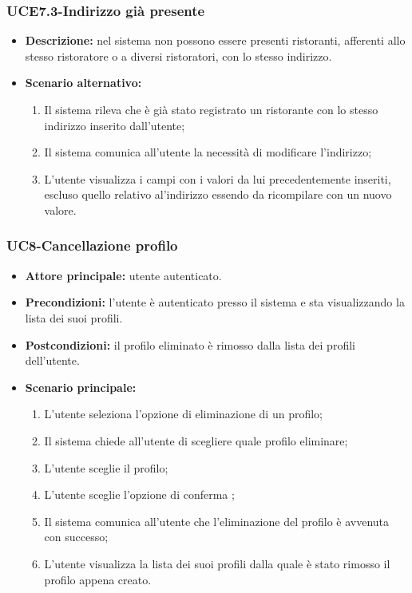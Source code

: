 \subsubsection{UCE7.3-Indirizzo già presente}
\begin{itemize}
    \item \textbf{Descrizione: }nel sistema non possono essere presenti ristoranti, afferenti allo stesso ristoratore
    o a diversi ristoratori, con lo stesso indirizzo.
    \item \textbf{Scenario alternativo:}
    \begin{enumerate}
        \item Il sistema rileva che è già stato registrato un ristorante con lo stesso indirizzo
        inserito dall'utente;
        \item Il sistema comunica all'utente la necessità di modificare l'indirizzo;
        \item L'utente visualizza i campi con i valori da lui precedentemente inseriti, escluso quello relativo al'indirizzo
        essendo da ricompilare con un nuovo valore.
    \end{enumerate}
\end{itemize}

\subsubsection{UC8-Cancellazione profilo}
\begin{itemize}
\item \textbf{Attore principale:} utente autenticato.
\item \textbf{Precondizioni:} l'utente è autenticato presso il sistema e sta visualizzando la lista dei suoi profili.
\item \textbf{Postcondizioni:} il profilo eliminato è rimosso dalla lista dei profili dell'utente.
\item \textbf{Scenario principale:}
\begin{enumerate}
    \item L'utente seleziona l'opzione di eliminazione di un profilo;
    \item Il sistema chiede all'utente di scegliere quale profilo eliminare;
    \item L'utente sceglie il profilo;
    \item L'utente sceglie l'opzione di conferma ;
    \item Il sistema comunica all'utente che l'eliminazione del profilo è avvenuta con successo;
    \item L'utente visualizza la lista dei suoi profili dalla quale è stato rimosso il profilo appena creato.
\end{enumerate}
\end{itemize}

